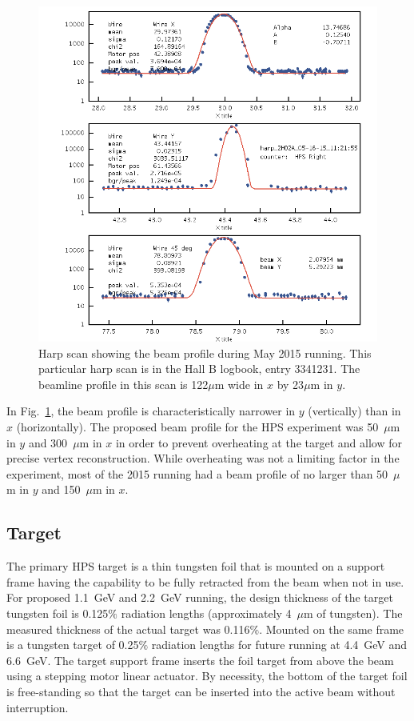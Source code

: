 \begin{figure}[H]
  \centering
      \includegraphics[width=1.0\textwidth]{pics/experiment/harpScan.png}
  \caption[Beam profile from harp scan during 2015 run]{Harp scan showing the beam profile during May 2015 running. This particular harp scan is in the Hall B logbook, entry 3341231. The beamline profile in this scan is 122$\mu$m wide in $x$ by 23$\mu$m in $y$.}
  \label{Figure:harpScan}
\end{figure}

In Fig.~\ref{Figure:harpScan}, the beam profile is characteristically narrower in $y$ (vertically) than in $x$ (horizontally). The proposed beam profile for the HPS experiment was 50~$\mu$m in $y$ and 300~$\mu$m in $x$ in order to prevent overheating at the target and allow for precise vertex reconstruction. While overheating was not a limiting factor in the experiment, most of the 2015 running had a beam profile of no larger than 50~$\mu$m in $y$ and 150~$\mu$m in $x$. 

\subsection{Target}

The primary HPS target is a thin tungsten foil that is mounted on a support frame having the capability to be fully retracted from the beam when not in use. For proposed 1.1~GeV and 2.2~GeV running, the design thickness of the target tungsten foil is 0.125$\%$ radiation lengths (approximately 4~$\mu$m of tungsten). The measured thickness of the actual target was 0.116$\%$. Mounted on the same frame is a tungsten target of 0.25$\%$ radiation lengths for future running at 4.4~GeV and 6.6~GeV. The target support frame inserts the foil target from above the beam using a stepping motor linear actuator. By necessity, the bottom of the target foil is free-standing so that the target can be inserted into the active beam without interruption.  

